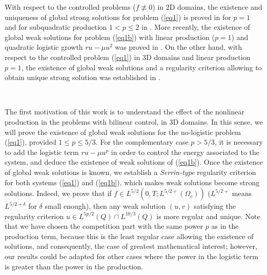 \documentclass[11pt,reqno]{amsart}%
\numberwithin{equation}{section}
\begin{document}
With respect to the controlled problems ($f \not\equiv 0$) in 2D domains, the  existence and uniqueness of global strong solutions for problem (\ref{eq1})  
 is proved in \cite{Exequiel2D} for  $p=1$ and 
for subquadratic production $1<p\leq 2$ in \cite{EFE2D}. 
More recently, the existence of global weak solutions for problem (\ref{eq1b}) with linear production ($p=1$)  and quadratic logistic growth $r u-\mu u^2$ was proved in \cite{Guillen4}.
On the other hand, with respect to the controlled problem (\ref{eq1})  in 3D domains and linear production $p=1$,  the existence of global weak solutions   and  a regularity criterion  allowing to obtain unique strong solution was established in  \cite{Exequiel3D}.
 
 \
 
  The first motivation of this work is to understand  the effect of the nonlinear production in the  problems with bilinear control,  in 3D domains.
In this sense, we will prove the existence of global weak solutions for the no-logistic problem  (\ref{eq1}), provided $1\leq p\leq 5/3$. For the complementary case $p>5/3$, it is necessary to add the logistic term $r u-\mu u^p$ in order to control  the energy associated to the system, and deduce the existence of weak solutions of (\ref{eq1b}). 
  Once the existence of global weak solutions is known, 
 we establish a {\it Serrin-type} regularity criterion for both systems (\ref{eq1}) and  (\ref{eq1b}),  
 which makes weak solutions 
  become strong solutions. Indeed, we prove that if $f\in L^{5/2}(0,T;L^{5/2+}(\Omega_c))$ 
  ($L^{5/2+}$ means $L^{5/2+\delta}$ for $\delta$ small enough), then any weak solution $(u,v)$ satisfying the regularity criterion $u\in L^{5p/2}(Q)\cap L^{10/3}(Q)$ is more regular and unique. Note that we have chosen the competition part with the same power $p$ as in the production term, because this is the least regular case allowing the existence of solutions, 
and consequently, the case of greatest mathematical interest; however, our results could be adapted for other cases where the power in the logistic term is greater than the power in the production. \\
\end{document}
